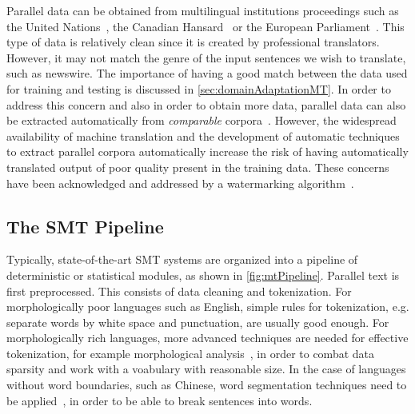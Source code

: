 Parallel data can be obtained from multilingual institutions
proceedings such as the United
Nations~\citep{franz-kumar-brants:2013:LDC},%
the Canadian
Hansard~\citep{germann:2001:WEB} or the
European Parliament~\citep{koehn:2005:MTSummit}.
This type of data is relatively clean since it is created
by professional translators. However, it may not match
the genre of the input sentences we wish to translate, such
as newswire. The importance of having a good match between
the data used for training and testing is discussed
in \autoref{sec:domainAdaptationMT}. In order to address
this concern and also in order to obtain more data, parallel
data can also be extracted automatically from \emph{comparable}
corpora~\citep{smith-saintamand-plamada-koehn-callisonburch-lopez:2013:ACL2013}.
However, the widespread availability of
machine translation and the development of automatic techniques
to extract parallel corpora automatically increase the
risk of having automatically translated output of poor
quality present in the training data. These concerns have
been acknowledged and addressed by a watermarking
algorithm~\citep{venugopal-uszkoreit-talbot-och-ganitkevitch:2011:EMNLP}.

\subsection{The SMT Pipeline}

Typically, state-of-the-art SMT systems are organized into
a pipeline of deterministic or statistical modules, as shown
in \autoref{fig:mtPipeline}.
Parallel text is first preprocessed. This consists of data cleaning
and tokenization.
For morphologically poor languages such as
English, simple rules for tokenization, e.g. separate words by white space
and punctuation, are usually good enough.
For morphologically rich languages, more advanced techniques
are needed for effective tokenization, for example
morphological analysis~\citep{habash-rambow:2005:ACL}, in order
to combat data sparsity and work with a voabulary with reasonable size.
In the case of languages without word
boundaries, such as Chinese, word segmentation techniques
need to be applied~\citep{zhang-clark:2007:ACL}, in order
to be able to break sentences into words.

